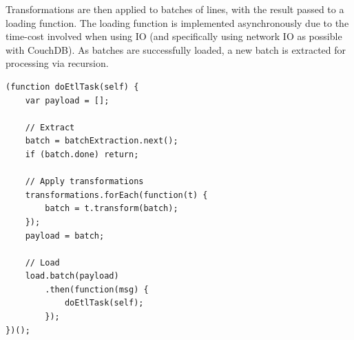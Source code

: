 Transformations are then applied to batches of lines, with the result passed to a loading function. The loading function is implemented asynchronously due to the time-cost involved when using IO (and specifically using network IO as possible with CouchDB). As batches are successfully loaded, a new batch is extracted for processing via recursion.

\begin{verbatim}
(function doEtlTask(self) {
    var payload = [];

    // Extract
    batch = batchExtraction.next();
    if (batch.done) return;

    // Apply transformations
    transformations.forEach(function(t) {
        batch = t.transform(batch);
    });
    payload = batch;

    // Load
    load.batch(payload)
        .then(function(msg) {
            doEtlTask(self);
        });
})();
\end{verbatim}
